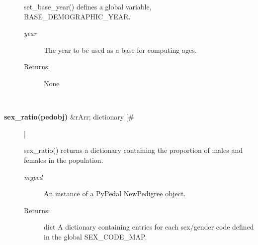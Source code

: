 \begin{description}
 set\_base\_year() defines a global variable, BASE\_DEMOGRAPHIC\_YEAR.
\begin{description}
\item[\emph{year}
] The year to be used as a base for computing ages.
\item[Returns:] None

\end{description}
\\ 

\item[\textbf{sex\_ratio(pedobj)}
 \&rArr; dictionary [\#]]

 sex\_ratio() returns a dictionary containing the proportion of males and females in the population.
\begin{description}
\item[\emph{myped}
] An instance of a PyPedal NewPedigree object.
\item[Returns:] dict A dictionary containing entries for each sex/gender code defined in the global SEX\_CODE\_MAP.

\end{description}
\\ 


\end{description}

